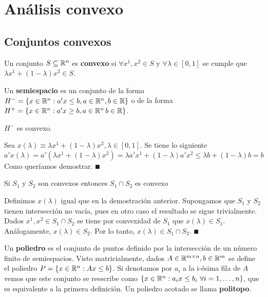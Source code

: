 \documentclass[PM.tex]{subfiles}
\begin{document}
\chapter{Análisis convexo}
\section{Conjuntos convexos}

\begin{defi}
Un conjunto $S\subseteq\mathbb{R}^n$ es \textbf{convexo} si $\forall x^1,x^2\in S$ y $\forall  \lambda\in[0,1]$ se cumple que $\lambda x^1 + (1-\lambda)x^2\in S$.
\end{defi}

\begin{defi}
Un \textbf{semiespacio} es un conjunto de la forma $H^-=\left\{x\in\mathbb{R}^n: a'x\leq b, a\in\mathbb{R}^n, b\in\mathbb{R}\right\}$ o de la forma $H^+=\left\{x\in\mathbb{R}^n: a'x\geq b, a\in\mathbb{R}^n\,b\in\mathbb{R}\right\}$.
\end{defi}

\begin{prop}
$H^-$ es convexo.
\end{prop}

\begin{dem}
Sea $x(\lambda)\equiv \lambda x^1 + (1-\lambda)x^2, \lambda\in[0,1]$. Se tiene lo siguiente
\[
a'x(\lambda)=a'(\lambda x^1 + (1-\lambda)x^2)=\lambda a'x^1 +(1-\lambda)a'x^2\leq \lambda b+(1-\lambda)b=b
\]
Como queríamos demostrar. $\QED$
\end{dem}

\begin{prop}
Si $S_1$ y $S_2$ son convexos entonces $S_1\cap S_2$ es convexo
\end{prop}
\begin{dem}
Definimos $x(\lambda)$ igual que en la demostración anterior. Supongamos que $S_1$ y $S_2$ tienen intersección no vacía, pues en otro caso el resultado se sigue trivialmente. Dados $x^1,x^2\in S_1 \cap S_2$ se tiene por convexidad de $S_1$ que $x(\lambda)\in S_1$. Análogamente, $x(\lambda)\in S_2$. Por lo tanto, $x(\lambda)\in S_1\cap S_2$. $\QED$
\end{dem}

\begin{defi}
Un \textbf{poliedro} es el conjunto de puntos definido por la intersección de un número finito de semiespacios. Visto matricialmente, dados $A\in\mathbb{R}^{m\times n}, b\in \mathbb{R}^m$ se define el poliedro $P=\left\{x\in \mathbb{R}^n: Ax\leq b\right\}$. Si denotamos por $a_i$ a la i-ésima fila de $A$ vemos que este conjunto se reescribe como $\left\{x\in\mathbb{R}^n: a_ix\leq b_i\ \forall i=1,\dots, n\right\}$, que es equivalente a la primera definición. Un poliedro acotado se llama \textbf{politopo}. 
\end{defi}
\end{document}
